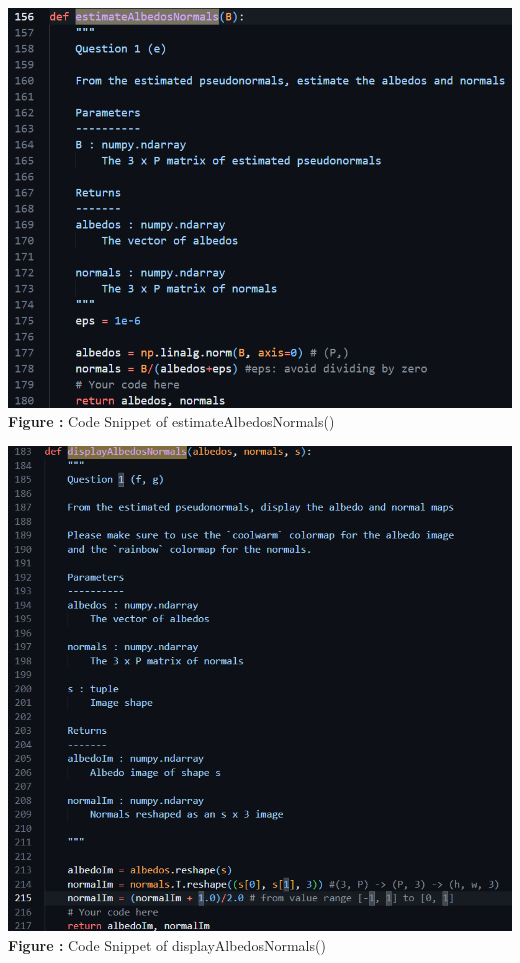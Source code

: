 \documentclass{article}
\begin{document}
	\begin{minipage}{0.48\linewidth}
	\centering
	\includegraphics[width=\linewidth]{./Q1_f_cns1.png}
	 \\ %
	\textbf{Figure \thefigure:} Code Snippet of estimateAlbedosNormals()  %
	\label{fig:Q1_f_cns1}         %
	\end{minipage}
\hfill
	\begin{minipage}{0.48\linewidth}
	\centering
	\includegraphics[width=\linewidth]{./Q1_f_cns2.png}
	 \\ %
	\textbf{Figure \thefigure:} Code Snippet of displayAlbedosNormals()  %
	\label{fig:Q1_f_cns2}         %
	\end{minipage}	
\newline	
\end{document}
